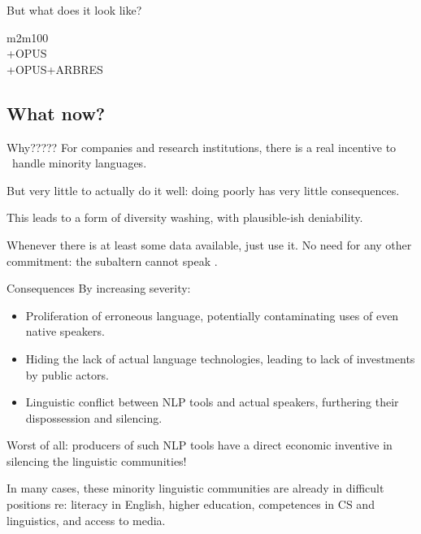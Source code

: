 \documentclass[
	xcolor={svgnames},
	aspectratio=169,
	french,
]{beamer}
\begin{document}
\begin{frame}{But what does it look like?}


	\begin{description}
		\item[m2m100] 
		\item[+OPUS] 
		\item[+OPUS+ARBRES] 
	\end{description}	
\end{frame}

\subsection{What now?}

\begin{frame}{Why?????}
	\onslide<+->
	For companies and research institutions, there is a real incentive to \ handle minority languages.

	\onslide<+->
	But very little to actually do it well: doing poorly has very little consequences.
	
	\onslide<+->
	This leads to a form of \alert{diversity washing}, with plausible-ish deniability.
	
	\onslide<+->
	Whenever there is at least some data available, just use it. No need for any other commitment: \alert{the subaltern cannot speak} \parencite{chakravortyspivak1988CanSubalternSpeak}.
\end{frame}

\begin{frame}{Consequences}
	By increasing severity:
	\begin{itemize}[<+->]
		\item Proliferation of erroneous language, potentially contaminating uses of even native speakers.
		\item Hiding the lack of actual language technologies, leading to lack of investments by public actors.
		\item Linguistic conflict between NLP tools and actual speakers, furthering their dispossession and silencing.
	\end{itemize}
	
	\onslide<+->
	Worst of all: producers of such NLP tools have a direct economic inventive in silencing the linguistic communities!
	
	\onslide<+->
	In many cases, these minority linguistic communities are already in difficult positions re: literacy in English, higher education, competences in CS and linguistics, and access to media.
\end{frame}
\end{document}
